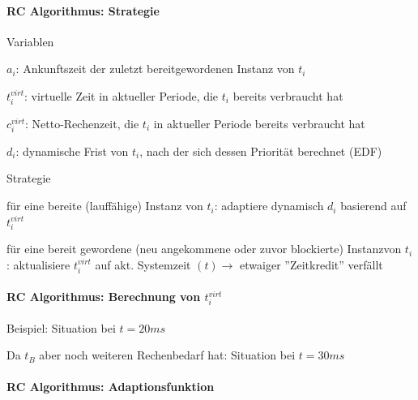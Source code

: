 \documentclass[a4paper]{article}
\begin{document}
\begin{multicols}{3}
    \paragraph{RC Algorithmus: Strategie}

    \begin{itemize*}
        \item Variablen
        \begin{itemize*}
            \item $a_i$: Ankunftszeit der zuletzt bereitgewordenen Instanz von $t_i$
            \item $t_i^{virt}$: virtuelle Zeit in aktueller Periode, die $t_i$ bereits verbraucht hat
            \item $c_i^{virt}$: Netto-Rechenzeit, die $t_i$ in aktueller Periode bereits verbraucht hat
            \item $d_i$: dynamische Frist von $t_i$, nach der sich dessen Priorität berechnet (EDF)
        \end{itemize*}
        \item Strategie
        \begin{itemize*}
            \item für eine bereite (lauffähige) Instanz von $t_i$: adaptiere dynamisch $d_i$ basierend auf $t_i^{virt}$
            \item für eine bereit gewordene (neu angekommene oder zuvor blockierte) Instanzvon $t_i$: aktualisiere $t_i^{virt}$ auf akt. Systemzeit $(t)\rightarrow$ etwaiger ''Zeitkredit'' verfällt
        \end{itemize*}
    \end{itemize*}


    \paragraph{RC Algorithmus: Berechnung von $t_i^{virt}$}

    Beispiel: Situation bei $t=20ms$

    Da $t_B$ aber noch weiteren Rechenbedarf hat: Situation bei $t=30
        ms$


    \paragraph{RC Algorithmus:
        Adaptionsfunktion}


\end{multicols}
\end{document}
